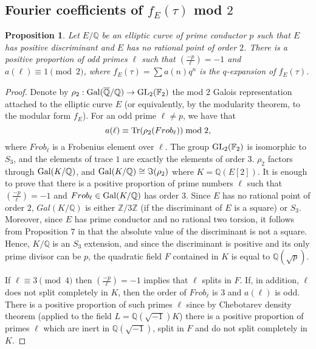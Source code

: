 \documentclass[13pt]{amsart}
\newtheorem{proposition}[theorem]{Proposition}
\theoremstyle{remark}
\numberwithin{theorem}{section} \numberwithin{equation}{section}
\begin{document}
\subsection{Fourier coefficients of $f_E(\tau)$ mod $2$}
\begin{proposition}\label{prop:ell} Let $E/{\mathbb{Q}}$ be an elliptic curve of prime conductor $p$ such that $E$ has positive discriminant and $E$ has no rational point of order $2$. There is a positive proportion of odd primes $\ell$ such that $\left(\frac{-p}{\ell}\right)= -1$ and $a(\ell)\equiv 1 \pmod{2}$, where $f_E(\tau)=\sum a(n)q^n$ is the $q$-expansion of $f_E(\tau)$. 
\end{proposition}
\begin{proof}
Denote by $\rho_2:{\rm Gal}(\overline{\mathbb{Q}}/{\mathbb{Q}}) \rightarrow {{\text {\rm GL}}}_2(\mathbb{F}_2)$ the 
mod $2$ Galois representation attached to the elliptic curve $E$ (or 
equivalently, by the modularity theorem, to the modular form $f_E$). For an odd 
prime $\ell\ne p$, we have that 
\[ a(\ell) \equiv {{\text {\rm Tr}}}(\rho_2(Frob_{\ell}))\bmod{2}, \] 
where $Frob_\ell$ is a Frobenius element over $\ell$. The group 
${{\text {\rm GL}}}_2(\mathbb{F}_2)$ is isomorphic to $S_3$, and the elements of trace $1$ are 
exactly the elements of order $3$. $\rho_2$ factors through ${\rm Gal}(K/{\mathbb{Q}})$, and 
${\rm Gal}(K/{\mathbb{Q}}) \cong \Im(\rho_2)$ where $K={\mathbb{Q}}(E[2])$. It is enough to prove that 
there is a positive proportion of prime numbers $\ell$ such that  
$\left(\frac{-p}{\ell}\right)= -1$ and $Frob_\ell\in {\rm Gal}(K/{\mathbb{Q}})$ has order $3$. 
Since $E$ has no rational point of order $2$, $Gal(K/{\mathbb{Q}})$ is either ${\mathbb{Z}}/3{\mathbb{Z}}$ 
(if the discriminant of $E$ is a square) or $S_3$. 
Moreover, since $E$ has prime conductor and no rational two torsion, it follows 
from Proposition $7$ in  \cite{Serre} that the absolute value 
of the discriminant 
is not a square. Hence, $K/{\mathbb{Q}}$ is an $S_3$ extension, and since the discriminant 
is positive and its only prime divisor can be $p$, the quadratic field $F$ 
contained in $K$ is equal to ${\mathbb{Q}}(\sqrt{p})$.

If $\ell \equiv 3 \pmod{4}$ then  $\left(\frac{-p}{\ell}\right)= -1$ implies 
that $\ell$ splits in $F$. If, in addition, $\ell$ does not split completely in 
$K$, then the order of $Frob_\ell$ is $3$ and $a(\ell)$ is odd. There is a 
positive proportion of such primes $\ell$ since by Chebotarev density theorem 
(applied to the field $L={\mathbb{Q}}(\sqrt{-1})K$) there is a positive 
proportion of primes $\ell$ which are inert in ${\mathbb{Q}}(\sqrt{-1})$, split in 
$F$ and do not split completely in $K$. 

\end{proof}
\end{document}
